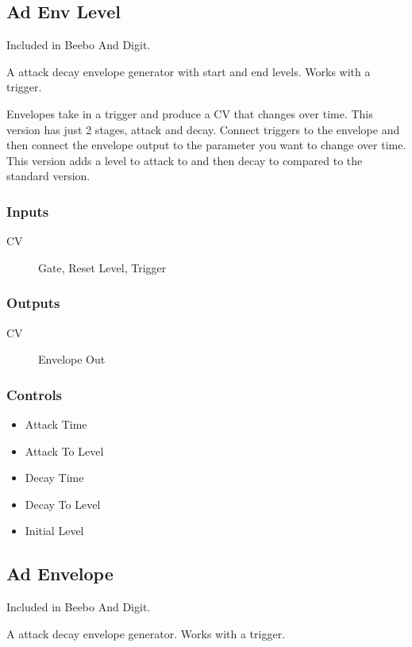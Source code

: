 \subsection{Ad Env Level}

Included in Beebo And Digit.

A attack decay envelope generator with start and end levels. Works with a trigger.

Envelopes take in a  trigger and produce a CV that changes over time.
                  This version has just 2 stages, attack and decay. Connect triggers to the envelope and then connect the envelope output to the parameter you want to change over time.
                  This version adds a level to attack to and then decay to compared to the standard version.

\subsubsection{Inputs}
\begin{description}
\item [CV] Gate, Reset Level, Trigger
\end{description}

\subsubsection{Outputs}
\begin{description}
\item [CV] Envelope Out
\end{description}

\subsubsection{Controls}
\begin{itemize}
\item Attack Time
\item Attack To Level
\item Decay Time
\item Decay To Level
\item Initial Level
\end{itemize}

\subsection{Ad Envelope}

Included in Beebo And Digit.

A attack decay envelope generator. Works with a trigger.

